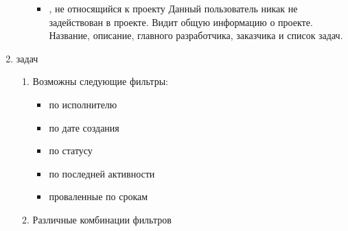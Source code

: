 \documentclass[14pt,a4paper]{extarticle}
\begin{document}
\begin{enumerate}
\begin{enumerate}
\begin{itemize}
\begin{itemize}
				\end{itemize}
				
				\item {, не относящийся к проекту}
				Данный пользователь никак не задействован в проекте. Видит общую информацию о проекте. Название, описание, главного разработчика, заказчика и список задач.
			\end{itemize}
		\end{enumerate}
		
		
		\item { задач}
		\begin{enumerate}
			\item  Возможны следующие фильтры:
			\begin{itemize}
				\item по исполнителю
				\item по дате создания
				\item по статусу
				\item по последней активности
				\item проваленные по срокам
			\end{itemize}
			
			\item Различные комбинации фильтров
		\end{enumerate}
		
	\end{enumerate}
	
\end{document}
